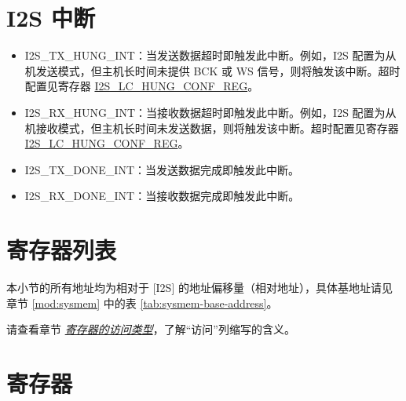 \documentclass[main\_\_CN.tex]{subfiles}
\begin{document}
\section{I2S 中断} \label{I2S_INT}

\begin{itemize}
\item \label{int:I2STXHUNGINT}I2S\_TX\_HUNG\_INT：当发送数据超时即触发此中断。例如，I2S 配置为从机发送模式，但主机长时间未提供 BCK 或 WS 信号，则将触发该中断。超时配置见寄存器 \hyperref[regdesc:I2SLCHUNGCONFREG]{I2S\_LC\_HUNG\_CONF\_REG}。
\item \label{int:I2SRXHUNGINT}I2S\_RX\_HUNG\_INT：当接收数据超时即触发此中断。例如，I2S 配置为从机接收模式，但主机长时间未发送数据，则将触发该中断。超时配置见寄存器 \hyperref[regdesc:I2SLCHUNGCONFREG]{I2S\_LC\_HUNG\_CONF\_REG}。
\item \label{int:I2STXDONEINT}I2S\_TX\_DONE\_INT：当发送数据完成即触发此中断。
\item \label{int:I2SRXDONEINT}I2S\_RX\_DONE\_INT：当接收数据完成即触发此中断。
\end{itemize}

\hypertarget{i2s-reg-summ}{}
\section{寄存器列表}


本小节的所有地址均为相对于 [I2S] 的地址偏移量（相对地址），具体基地址请见章节 \ref{mod:sysmem} \textit{} 中的表 \ref{tab:sysmem-base-address}。

请查看章节 \hyperref[glossary-access-types]{\textit{寄存器的访问类型}}，了解“访问”列缩写的含义。




%

\section{寄存器}\label{I2SRegister}



%
\end{document}

